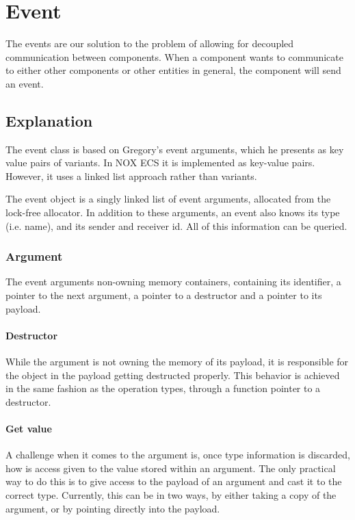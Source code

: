 \section{Event}
\label{subsec:detailed_event}
The events are our solution to the problem of allowing for decoupled communication
between components.
When a component wants to communicate to either other components or other entities in general, the component will send an event.

\subsection{Explanation}
The event class is based on Gregory's\cite[p. 938]{game_engine_architecture} event arguments, which he presents as key value pairs of variants.
In NOX ECS it is implemented as key-value pairs.
However, it uses a linked list approach rather than variants.

The event object is a singly linked list of event arguments, allocated from
the lock-free allocator.
In addition to these arguments, an event also knows its type (i.e. name), and its sender and receiver id.
All of this information can be queried.

\subsubsection{Argument}
The event arguments non-owning memory containers, containing its identifier,
a pointer to the next argument, a pointer to a destructor and a pointer to its payload.

\paragraph{Destructor}
While the argument is not owning the memory of its payload, it is responsible for the object
in the payload getting destructed properly.
This behavior is achieved in the same fashion as the operation types, through a function pointer to a destructor.

\paragraph{Get value}
A challenge when it comes to the argument is, once type information is discarded, how is access given to the value stored within an argument.
The only practical way to do this is to give access to the payload of an argument and cast it to the correct type. Currently, this can be in two ways, by either taking a copy of the argument,
or by pointing directly into the payload.

